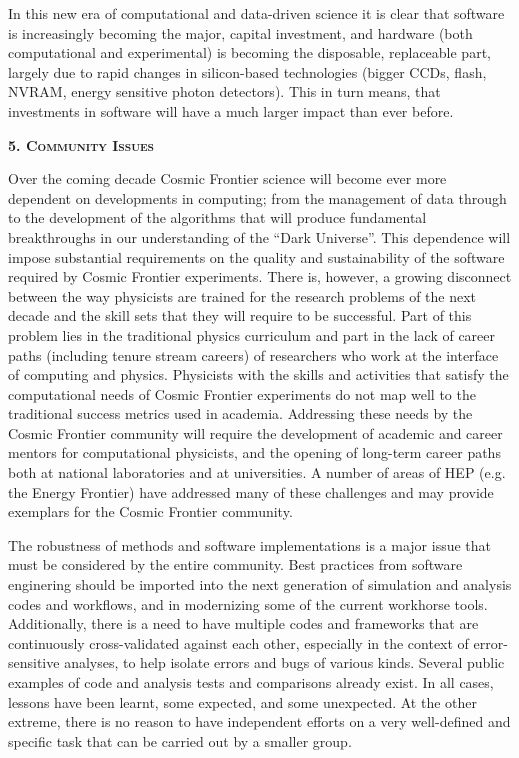 In this new era of computational and data-driven science it is clear
that software is increasingly becoming the major, capital investment,
and hardware (both computational and experimental) is becoming the
disposable, replaceable part, largely due to rapid changes in
silicon-based technologies (bigger CCDs, flash, NVRAM, energy
sensitive photon detectors).  This in turn means, that investments in
software will have a much larger impact than ever before.

\begin{center}
{\bf\scshape{5. Community Issues}}
\end{center}


\medskip

Over the coming decade Cosmic Frontier science will become ever more
dependent on developments in computing; from the management of data
through to the development of the algorithms that will produce
fundamental breakthroughs in our understanding of the ``Dark
Universe''. This dependence will impose substantial requirements on
the quality and sustainability of the software required by Cosmic
Frontier experiments. There is, however, a growing disconnect between
the way physicists are trained for the research problems of the next
decade and the skill sets that they will require to be
successful. Part of this problem lies in the traditional physics
curriculum and part in the lack of career paths (including tenure
stream careers) of researchers who work at the interface of computing
and physics. Physicists with the skills and activities that satisfy
the computational needs of Cosmic Frontier experiments do not map well
to the traditional success metrics used in academia. Addressing these
needs by the Cosmic Frontier community will require the development of
academic and career mentors for computational physicists, and the
opening of long-term career paths both at national laboratories and at
universities. A number of areas of HEP (e.g. the Energy Frontier) have
addressed many of these challenges and may provide exemplars for the
Cosmic Frontier community.

\medskip


The robustness of methods and software implementations is a major
issue that must be considered by the entire community. Best practices
from software enginering should be imported into the next generation
of simulation and analysis codes and workflows, and in modernizing
some of the current workhorse tools. Additionally, there is
a need to have multiple codes and frameworks that are continuously
cross-validated against each other, especially in the context of
error-sensitive analyses, to help isolate errors and bugs of various
kinds. Several public examples of code and analysis tests and
comparisons already exist. In all cases, lessons have been learnt,
some expected, and some unexpected. At the other extreme, there is no
reason to have independent efforts on a very well-defined and specific
task that can be carried out by a smaller group.

